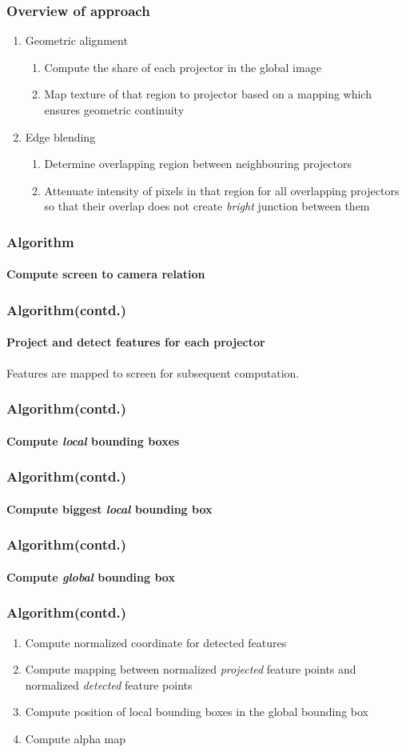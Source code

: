 \documentclass{beamer}
\begin{document}
\begin{frame}
\frametitle{Overview of approach}
\begin{enumerate}
\item Geometric alignment
\begin{enumerate}
\item Compute the share of each projector in the global image
\item Map texture of that region to projector based on a mapping which ensures geometric continuity
\end{enumerate}
\item Edge blending
\begin{enumerate}
\item Determine overlapping region between neighbouring projectors
\item Attenuate intensity of pixels in that region for all overlapping projectors so that their overlap does not create \textit{bright} junction between them
\end{enumerate}
\end{enumerate}
\end{frame}




\begin{frame}
\frametitle{Algorithm}
\framesubtitle{Compute screen to camera relation}
\end{frame}

\begin{frame}
\frametitle{Algorithm(contd.)}
\framesubtitle{Project and detect features for each projector}
Features are mapped to screen for subsequent computation.
\end{frame}

\begin{frame}
\frametitle{Algorithm(contd.)}
\framesubtitle{Compute \textit{local} bounding boxes}
\end{frame}

\begin{frame}
\frametitle{Algorithm(contd.)}
\framesubtitle{Compute biggest \textit{local} bounding box}
\end{frame}


\begin{frame}
\frametitle{Algorithm(contd.)}
\framesubtitle{Compute \textit{global} bounding box}
\end{frame}

\begin{frame}
\frametitle{Algorithm(contd.)}
\begin{enumerate}
\item Compute normalized coordinate for detected features
\item Compute mapping between normalized \textit{projected} feature points and normalized \textit{detected} feature points
\item Compute position of local bounding boxes in the global bounding box
\item Compute alpha map
\end{enumerate}
\end{frame}
\end{document}

